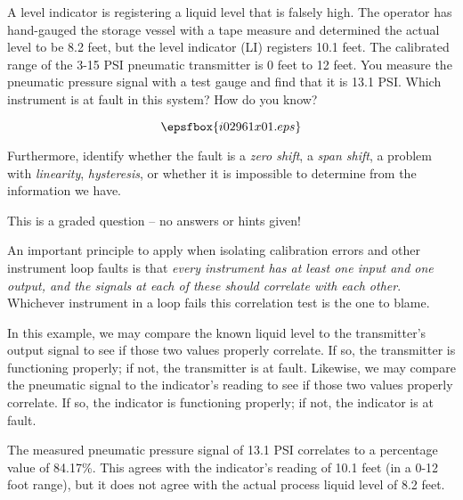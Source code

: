 

A level indicator is registering a liquid level that is falsely high.  The operator has hand-gauged the storage vessel with a tape measure and determined the actual level to be 8.2 feet, but the level indicator (LI) registers 10.1 feet.  The calibrated range of the 3-15 PSI pneumatic transmitter is 0 feet to 12 feet.  You measure the pneumatic pressure signal with a test gauge and find that it is 13.1 PSI.  Which instrument is at fault in this system?  How do you know?

$$\epsfbox{i02961x01.eps}$$

Furthermore, identify whether the fault is a {\it zero shift}, a {\it span shift}, a problem with {\it linearity}, {\it hysteresis}, or whether it is impossible to determine from the information we have.

\vfil 

\eject






This is a graded question -- no answers or hints given!







An important principle to apply when isolating calibration errors and other instrument loop faults is that {\it every instrument has at least one input and one output, and the signals at each of these should correlate with each other}.  Whichever instrument in a loop fails this correlation test is the one to blame.

\vskip 10pt

In this example, we may compare the known liquid level to the transmitter's output signal to see if those two values properly correlate.  If so, the transmitter is functioning properly; if not, the transmitter is at fault.  Likewise, we may compare the pneumatic signal to the indicator's reading to see if those two values properly correlate.  If so, the indicator is functioning properly; if not, the indicator is at fault.

\vskip 10pt

The measured pneumatic pressure signal of 13.1 PSI correlates to a percentage value of 84.17\%.  This agrees with the indicator's reading of 10.1 feet (in a 0-12 foot range), but it does not agree with the actual process liquid level of 8.2 feet.

